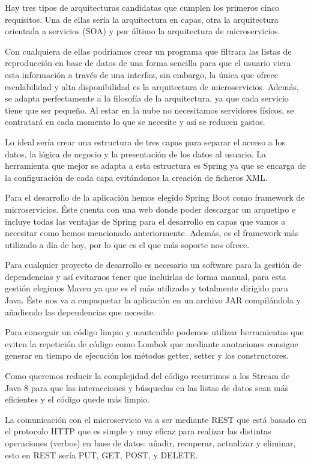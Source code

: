\documentclass[12pt]{report} %
\begin{document}
Hay tres tipos de arquitecturas candidatas que cumplen los primeros cinco requisitos. Una de ellas sería la arquitectura en capas, otra la arquitectura orientada a servicios (SOA) y por último la arquitectura de microservicios. 

Con cualquiera de ellas podríamos crear un programa que filtrara las listas de reproducción en base de datos de una forma sencilla para que el usuario viera esta información a través de una interfaz, sin embargo, la única que ofrece escalabilidad y alta disponibilidad es la arquitectura de microservicios. Además, se adapta perfectamente a la filosofía de la arquitectura, ya que cada servicio tiene que ser pequeño. Al estar en la nube no necesitamos servidores físicos, se contratará en cada momento lo que se necesite y así se reducen gastos.

Lo ideal sería crear una estructura de tres capas para separar el acceso a los datos, la lógica de negocio y la presentación de los datos al usuario. La herramienta que mejor se adapta a esta estructura es Spring ya que se encarga de la configuración de cada capa evitándonos la creación de ficheros XML.

Para el desarrollo de la aplicación hemos elegido Spring Boot como framework de microservicios. Éste cuenta con una web donde poder descargar un arquetipo e incluye todas las ventajas de Spring para el desarrollo en capas que vamos a necesitar como hemos mencionado anteriormente. Además, es el framework más utilizado a día de hoy, por lo que es el que más soporte nos ofrece.

Para cualquier proyecto de desarrollo es necesario un software para la gestión de dependencias y así evitarnos tener que incluirlas de forma manual, para esta gestión elegimos Maven ya que es el más utilizado y totalmente dirigido para Java. Éste nos va a empaquetar la aplicación en un archivo JAR compilándola y añadiendo las dependencias que necesite.

Para conseguir un código limpio y mantenible podemos utilizar herramientas que eviten la repetición de código como Lombok que mediante anotaciones consigue generar en tiempo de ejecución los métodos getter, setter y los constructores.

Como queremos reducir la complejidad del código recurrimos a los Stream de Java 8 para que las  interacciones y búsquedas en las listas de datos sean más eficientes y el código quede más limpio.

La comunicación con el microservicio va a ser mediante REST que está basado en el protocolo HTTP que es simple y muy eficaz para realizar las distintas operaciones (verbos) en base de datos: añadir, recuperar, actualizar y eliminar, esto en REST sería PUT, GET, POST, y DELETE.
\end{document}

